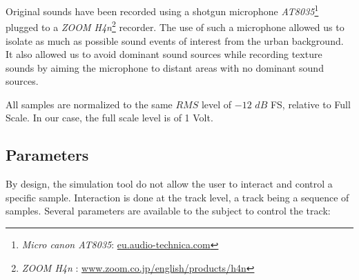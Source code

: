 \documentclass[twoside,twocolumn]{article}
\begin{document}

Original sounds have been recorded using a shotgun microphone \emph{AT8035}\footnote{\emph{Micro canon AT8035}: \url{eu.audio-technica.com}} plugged to a \emph{ZOOM H4n}\footnote{\emph{ZOOM H4n} : \url{www.zoom.co.jp/english/products/h4n}} recorder. The use of such a microphone allowed us to isolate as much as possible sound events of interest from the urban background. It also allowed us to avoid dominant sound sources while recording texture sounds by aiming the microphone to distant areas with no dominant sound sources.


All samples are normalized to the same $RMS$ level of $-12$ $dB$ FS, \ie relative to Full Scale. In our case, the full scale level is of 1 Volt.

\subsection{Parameters}
\label{sec:simscene_parametre}


By design, the simulation tool do not allow the user to interact and control a specific sample. Interaction is done at the track level, a track being a sequence of samples. Several parameters are available to the subject to control the track:

\end{document}
